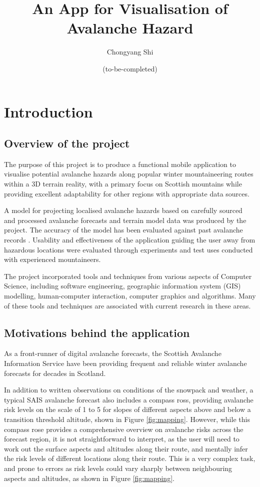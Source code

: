 \documentclass[openany]{UoYCSproject}
\title{An App for Visualisation of Avalanche Hazard}
\author{Chongyang Shi}
\date{(to-be-completed)}
\begin{document}
{\let\cleardoublepage\clearpage 
    \maketitle
}

\chapter{Introduction}

\section{Overview of the project}

The purpose of this project is to produce a functional mobile application to visualise potential avalanche hazards along popular winter mountaineering routes within a 3D terrain reality, with a primary focus on Scottish mountains while providing excellent adaptability for other regions with appropriate data sources. 

A model for projecting localised avalanche hazards based on carefully sourced and processed avalanche forecasts \cite{sais} and terrain model data \cite{os-5} was produced by the project. The accuracy of the model has been evaluated against past avalanche records \cite[pp. 143-151]{scottish-avalanches}\cite{sais-map}. Usability and effectiveness of the application guiding the user away from hazardous locations were evaluated through experiments and test uses conducted with experienced mountaineers.

The project incorporated tools and techniques from various aspects of Computer Science, including software engineering, geographic information system (GIS) modelling, human-computer interaction, computer graphics and algorithms. Many of these tools and techniques are associated with current research in these areas.

\section{Motivations behind the application}

As a front-runner of digital avalanche forecasts, the Scottish Avalanche Information Service \cite{sais} have been providing frequent and reliable winter avalanche forecasts for decades in Scotland.

In addition to written observations on conditions of the snowpack and weather, a typical SAIS avalanche forecast also includes a compass ross, providing avalanche risk levels on the scale of 1 to 5 for slopes of different aspects above and below a transition threshold altitude, shown in Figure \ref{fig:mapping}. However, while this compass rose provides a comprehensive overview on avalanche risks across the forecast region, it is not straightforward to interpret, as the user will need to work out the surface aspects and altitudes along their route, and mentally infer the risk levels of different locations along their route. This is a very complex task, and prone to errors as risk levels could vary sharply between neighbouring aspects and altitudes, as shown in Figure \ref{fig:mapping}.
\end{document}
